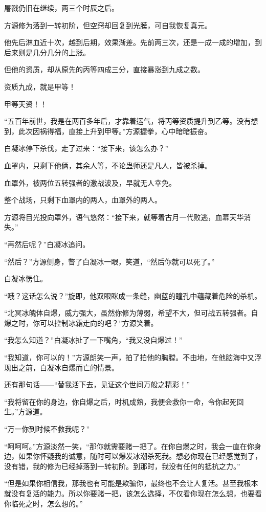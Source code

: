 \begin{this_body}
屠戮仍旧在继续，两三个时辰之后。

方源修为落到一转初阶，但空窍却回复到光膜，可自我恢复真元。

他先后淋血近十次，越到后期，效果渐差。先前两三次，还是一成一成的增加，到后来则是几分几分的上涨。

但他的资质，却从原先的丙等四成三分，直接暴涨到九成之数。

资质九成，就是甲等！

甲等天资！！

“五百年前世，我是在两百多年后，才靠着运气，将丙等资质提升到乙等。没有想到，此次因祸得福，直接上升到甲等。”方源握拳，心中暗暗振奋。

白凝冰停下杀伐，走了过来：“接下来，该怎么办？”

血罩内，只剩下他俩，其余人等，不论蛊师还是凡人，皆被杀掉。

血罩外，被两位五转强者的激战波及，早就无人幸免。

整个战场，只剩下血罩内的两人，血罩外的两人。

方源将目光投向罩外，语气悠然：“接下来，就等着古月一代败逃，血幕天华消失。”

“再然后呢？”白凝冰追问。

“然后？”方源侧身，瞥了白凝冰一眼，笑道，“然后你就可以死了。”

白凝冰愣住。

“哦？这话怎么说？”旋即，他双眼眯成一条缝，幽蓝的瞳孔中蕴藏着危险的杀机。

“北冥冰魄体自爆，威力强大，虽然你修为薄弱，希望不大，但可战五转强者。自爆之时，你可以控制冰霜走向的吧？”方源笑着。

“我怎么知道？”白凝冰扯了一下嘴角，“我又没自爆过！”

“我知道，你可以的！”方源朗笑一声，拍了拍他的胸膛。不由地，在他脑海中又浮现出之前，白凝冰自爆而亡的情景。

还有那句话——“替我活下去，见证这个世间万般之精彩！”

“我将留在你的身边，你自爆之后，时机成熟，我便会救你一命，令你起死回生。”方源道。

“万一你到时候不救我呢？”

“呵呵呵。”方源淡然一笑，“那你就需要赌一把了。在你自爆之时，我会一直在你身边，如果你怀疑我的诚意，随时可以爆发冰潮杀死我。想必你现在已经感觉到了，没有错，我的修为已经掉落到一转初阶。到那时，我没有任何的抵抗之力。”

“但是如果你相信我，那我也有可能是欺骗你，最终也不会让人复活。甚至我根本就没有复活的能力。所以你要赌一把，该怎么选择，不仅看你现在怎么想，也要看你临死之时，怎么想的。”


\end{this_body}
